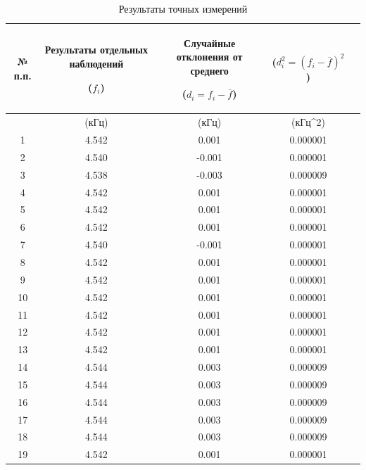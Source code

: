 \begin{center}
\begin{table}[h!]
\centering
\caption{Результаты точных измерений}
\label{tabl:2}
\begin{tabular}{|c|c|c|c|c|}
\hline
\begin{minipage}{7mm}
    № п.п. 
\end{minipage}&
\begin{minipage}{5cm}
\begin{center}
    Результаты отдельных наблюдений 
    
    ($f_i$)
\end{center}
\end{minipage} &
\begin{minipage}{5cm}
\begin{center}
    Случайные отклонения от среднего
    
    ($d_i = f_i - \overline{f}$)
\end{center}
\end{minipage} &
\begin{minipage}{5cm}
\begin{center}
    ($d_i^2 = (f_i - \overline{f})^2$)
\end{center}
\end{minipage}\\
\hline
{}&(кГц)&(кГц)&(кГц^2)\\
\hline
1  &    4.542  &  0.001 & 0.000001 \\
2  &    4.540  &  -0.001 & 0.000001 \\
3  &	4.538  &  -0.003 & 0.000009 \\
4  &	4.542  &  0.001 & 0.000001 \\
5  &	4.542  &  0.001 & 0.000001 \\
6  &	4.542  &  0.001 & 0.000001 \\
7  &	4.540  &  -0.001 & 0.000001 \\
8  &	4.542  &  0.001 & 0.000001 \\
9  &    4.542  &  0.001 & 0.000001 \\
10 &	4.542  &  0.001 & 0.000001 \\
11 &	4.542  &  0.001 & 0.000001 \\
12 &	4.542  &  0.001 & 0.000001 \\
13 &	4.542  &  0.001 & 0.000001 \\
14 &	4.544  &  0.003 & 0.000009 \\
15 &	4.544  &  0.003 & 0.000009 \\
16 &	4.544  &  0.003 & 0.000009 \\
17 &	4.544  &  0.003 & 0.000009 \\
18 &	4.544  &  0.003 & 0.000009 \\
19 &	4.542  &  0.001 & 0.000001 \\
\hline
\end{tabular}
\end{table}
\end{center}

